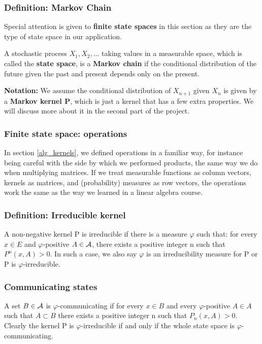 \subsubsection{Definition: Markov Chain}

Special attention is given to \textbf{finite state spaces} in this section as they are the type of state space in our application.

A stochastic process $X_1, X_2, ...$ taking values in a measurable space, which is called the \textbf{state space}, is a \textbf{Markov chain} if the conditional distribution of the future given the past and present depends only on the present.

\textbf{Notation:} We assume the conditional distribution of $X_{n+1}$ given $X_n$ is given by a \textbf{Markov kernel P}, which is just a kernel that has a few extra properties. We will discuss more about it in the second part of the project.

\subsubsection{Finite state space: operations}

In section \ref{alg_kernels}, we defined operations in a familiar way, for instance being careful with the side by which we performed products, the same way we do when multiplying matrices. If we treat measurable functions as column vectors, kernels as matrices, and (probability) measures as row vectors, the operations work the same as the way we learned in a linear algebra course.

\subsubsection{Definition: Irreducible kernel}
A non-negative kernel P is irreducible if there is a measure $\varphi$ such that: for every $x \in E$ and $\varphi$-positive $A \in \mathcal{A}$, there exists a positive integer n such that $P^n(x,A) > 0$. In such a case, we also say $\varphi$ is an irreducibility measure for P or P is $\varphi$-irreducible.

\subsubsection{Communicating states}
A set $B \in \mathcal{A}$ is $\varphi$-communicating if for every $x \in B$ and every $\varphi$-positive $A \in A$ such that $A \subset B$ there exists a positive integer n such that $P_n(x,A) > 0$. Clearly the kernel P is $\varphi$-irreducible if and only if the whole state space is $\varphi$-communicating.

